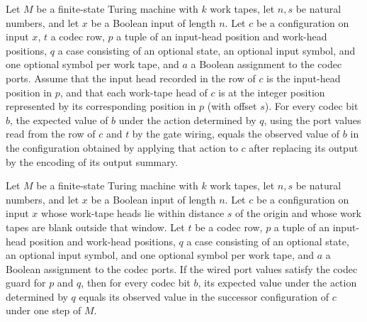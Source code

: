 \begin{theorem}
\label{Complexity.codecExpected_apply}
\leanok
{}
Let $M$ be a finite-state Turing machine with $k$ work tapes, let $n,s$ be natural
numbers, and let $x$ be a Boolean input of length $n$. Let $c$ be a configuration on
input $x$, $t$ a codec row, $p$ a tuple of an input-head position and work-head
positions, $q$ a case consisting of an optional state, an optional input symbol, and one
optional symbol per work tape, and $a$ a Boolean assignment to the codec ports. Assume
that the input head recorded in the row of $c$ is the input-head position in $p$, and
that each work-tape head of $c$ is at the integer position represented by its
corresponding position in $p$ (with offset $s$). For every codec bit $b$, the expected
value of $b$ under the action determined by $q$, using the port values read from the row
of $c$ and $t$ by the gate wiring, equals the observed value of $b$ in the configuration
obtained by applying that action to $c$ after replacing its output by the encoding of
its output summary.
\end{theorem}

\begin{theorem}
\label{Complexity.codecExpected_step}
\leanok
{}
Let $M$ be a finite-state Turing machine with $k$ work tapes, let $n,s$ be natural
numbers, and let $x$ be a Boolean input of length $n$. Let $c$ be a configuration on
input $x$ whose work-tape heads lie within distance $s$ of the origin and whose work
tapes are blank outside that window. Let $t$ be a codec row, $p$ a tuple of an
input-head position and work-head positions, $q$ a case consisting of an optional state,
an optional input symbol, and one optional symbol per work tape, and $a$ a Boolean
assignment to the codec ports. If the wired port values satisfy the codec guard for $p$
and $q$, then for every codec bit $b$, its expected value under the action determined by
$q$ equals its observed value in the successor configuration of $c$ under one step of
$M$.
\end{theorem}

